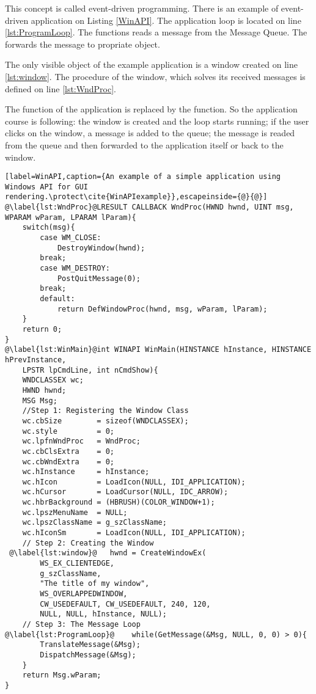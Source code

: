 This concept is called event-driven programming. There is an example of event-driven application on Listing \ref{WinAPI}. The application loop is located on line \ref{lst:ProgramLoop}. The  functions reads a message from the Message Queue. The  forwards the message to propriate object.

The only visible object of the example application is a window created on line \ref{lst:window}. The procedure of the window, which solves its received messages is defined on line \ref{lst:WndProc}.

The  function of the application is replaced by the  function. So the application course is following: the window is created and the loop starts running; if the user clicks on the window, a message is added to the queue; the message is readed from the queue and then forwarded to the application itself or back to the window.\cite[Chapter~2]{eventloopprogramming}

\begin{lstlisting}[label=WinAPI,caption={An example of a simple application using Windows API for GUI rendering.\protect\cite{WinAPIexample}},escapeinside={@}{@}]
@\label{lst:WndProc}@LRESULT CALLBACK WndProc(HWND hwnd, UINT msg, WPARAM wParam, LPARAM lParam){
    switch(msg){
        case WM_CLOSE:
            DestroyWindow(hwnd);
        break;
        case WM_DESTROY:
            PostQuitMessage(0);
        break;
        default:
            return DefWindowProc(hwnd, msg, wParam, lParam);
    }
    return 0;
}
@\label{lst:WinMain}@int WINAPI WinMain(HINSTANCE hInstance, HINSTANCE hPrevInstance,
    LPSTR lpCmdLine, int nCmdShow){
    WNDCLASSEX wc;
    HWND hwnd;
    MSG Msg;
    //Step 1: Registering the Window Class
    wc.cbSize        = sizeof(WNDCLASSEX);
    wc.style         = 0;
    wc.lpfnWndProc   = WndProc;
    wc.cbClsExtra    = 0;
    wc.cbWndExtra    = 0;
    wc.hInstance     = hInstance;
    wc.hIcon         = LoadIcon(NULL, IDI_APPLICATION);
    wc.hCursor       = LoadCursor(NULL, IDC_ARROW);
    wc.hbrBackground = (HBRUSH)(COLOR_WINDOW+1);
    wc.lpszMenuName  = NULL;
    wc.lpszClassName = g_szClassName;
    wc.hIconSm       = LoadIcon(NULL, IDI_APPLICATION);
    // Step 2: Creating the Window
 @\label{lst:window}@   hwnd = CreateWindowEx(
        WS_EX_CLIENTEDGE,
        g_szClassName,
        "The title of my window",
        WS_OVERLAPPEDWINDOW,
        CW_USEDEFAULT, CW_USEDEFAULT, 240, 120,
        NULL, NULL, hInstance, NULL);
    // Step 3: The Message Loop
@\label{lst:ProgramLoop}@    while(GetMessage(&Msg, NULL, 0, 0) > 0){
        TranslateMessage(&Msg);
        DispatchMessage(&Msg);
    }
    return Msg.wParam;
}
\end{lstlisting}

